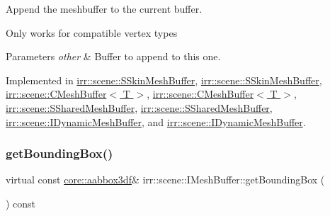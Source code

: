 Append the meshbuffer to the current buffer. 

Only works for compatible vertex types 
\begin{DoxyParams}{Parameters}
{\em other} & Buffer to append to this one. \\
\hline
\end{DoxyParams}


Implemented in \hyperlink{structirr_1_1scene_1_1SSkinMeshBuffer_a5395bc06c4c6b1c9a82dbdd56916a9e0}{irr\+::scene\+::\+S\+Skin\+Mesh\+Buffer}, \hyperlink{structirr_1_1scene_1_1SSkinMeshBuffer_a5395bc06c4c6b1c9a82dbdd56916a9e0}{irr\+::scene\+::\+S\+Skin\+Mesh\+Buffer}, \hyperlink{classirr_1_1scene_1_1CMeshBuffer_af48b88e6c1bd79e6abd6a6803aa106c0}{irr\+::scene\+::\+C\+Mesh\+Buffer$<$ T $>$}, \hyperlink{classirr_1_1scene_1_1CMeshBuffer_af48b88e6c1bd79e6abd6a6803aa106c0}{irr\+::scene\+::\+C\+Mesh\+Buffer$<$ T $>$}, \hyperlink{structirr_1_1scene_1_1SSharedMeshBuffer_aa4fbcc497cfd0b431bb85d607ed6a2fb}{irr\+::scene\+::\+S\+Shared\+Mesh\+Buffer}, \hyperlink{structirr_1_1scene_1_1SSharedMeshBuffer_aa4fbcc497cfd0b431bb85d607ed6a2fb}{irr\+::scene\+::\+S\+Shared\+Mesh\+Buffer}, \hyperlink{classirr_1_1scene_1_1IDynamicMeshBuffer_aada30374517d2a52d6264b6359a1e35c}{irr\+::scene\+::\+I\+Dynamic\+Mesh\+Buffer}, and \hyperlink{classirr_1_1scene_1_1IDynamicMeshBuffer_aada30374517d2a52d6264b6359a1e35c}{irr\+::scene\+::\+I\+Dynamic\+Mesh\+Buffer}.

\mbox{\label{classirr_1_1scene_1_1IMeshBuffer_ac53fe1096756a40f25dae25911e27c51}} 
\subsubsection{\texorpdfstring{get\+Bounding\+Box()}{getBoundingBox()}\hspace{0.1cm}{\footnotesize\ttfamily [1/2]}}
{\footnotesize\ttfamily virtual const \hyperlink{namespaceirr_1_1core_a60f4b4c744aba55f10530d503c6ecb04}{core\+::aabbox3df}\& irr\+::scene\+::\+I\+Mesh\+Buffer\+::get\+Bounding\+Box (\begin{DoxyParamCaption}{ }\end{DoxyParamCaption}) const\hspace{0.3cm}{\ttfamily [pure virtual]}}



